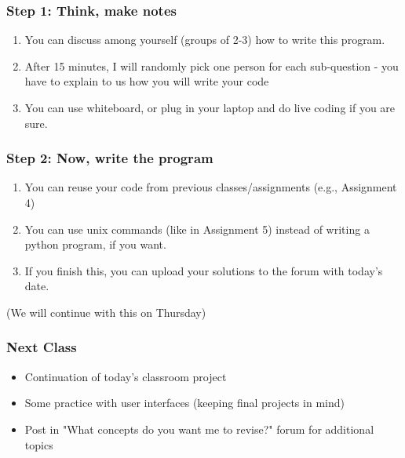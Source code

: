 \documentclass{beamer}
\begin{document}
\begin{frame}
\frametitle{Step 1: Think, make notes}
\begin{enumerate}
\item You can discuss among yourself (groups of 2-3) how to write this program.
\item After 15 minutes, I will randomly pick one person for each sub-question - you have to explain to us how you will write your code
\item You can use whiteboard, or plug in your laptop and do live coding if you are sure.
\end{enumerate}
\end{frame}

\begin{frame}
\frametitle{Step 2: Now, write the program}
\begin{enumerate}
\item You can reuse your code from previous classes/assignments (e.g., Assignment 4)
\item You can use unix commands (like in Assignment 5) instead of writing a python program, if you want.
\item If you finish this, you can upload your solutions to the forum with today's date.
\end{enumerate}
(We will continue with this on Thursday)
\end{frame}

\begin{frame}
\frametitle{Next Class}
\begin{itemize}
\item Continuation of today's classroom project
\item Some practice with user interfaces (keeping final projects in mind)
\item Post in "What concepts do you want me to revise?" forum for additional topics
\end{itemize}
\end{frame}
\end{document}
